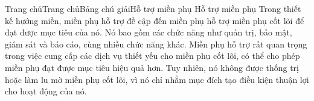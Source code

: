 Trang chủTrang chủBảng chú giảiHỗ trợ miền phụ
Hỗ trợ miền phụ
Trong thiết kế hướng miền, miền phụ hỗ trợ đề cập đến miền phụ hỗ trợ miền phụ cốt lõi để đạt được mục tiêu của nó. Nó bao gồm các chức năng như quản trị, bảo mật, giám sát và báo cáo, cùng nhiều chức năng khác. Miền phụ hỗ trợ rất quan trọng trong việc cung cấp các dịch vụ thiết yếu cho miền phụ cốt lõi, có thể cho phép miền phụ đạt được mục tiêu hiệu quả hơn. Tuy nhiên, nó không được thống trị hoặc làm lu mờ miền phụ cốt lõi, vì nó chỉ nhằm mục đích tạo điều kiện thuận lợi cho hoạt động của nó.


